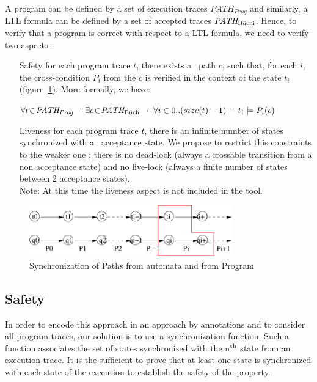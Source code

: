 \documentclass{report}
\begin{document}
A program can be defined by a set of execution traces
$\textit{PATH}_{\textit{Prog}}$ and similarly, a LTL formula can be defined by a
set of accepted traces $\textit{PATH}_{\textnormal{B\"uchi}}$. Hence, to verify that a program
is correct with respect to a LTL formula, we need to verify two aspects:
\begin{itemize}
  \item[Safety] for each program trace $t$, there exists a \buchi\ path $c$,
    such that, for each $i$, the cross-condition $P_i$ from the $c$ is verified
    in the context of the state $t_i$ (figure~\ref{FigExplicationSynchro}). More
    formally, we have:

    \centerline{
      $\forall t \!\in\! \textit{PATH}_{\textit{Prog}} ~\cdot~ \exists c \!\in\!
      \textit{PATH}_{\textnormal{B\"uchi}} ~\cdot~ \forall i\in 0..(size(t)-1) ~\cdot~ t_i
      \models P_i(c)$
    }


  \item[Liveness] for each program trace $t$, there is an infinite number of
    states synchronized with a \buchi\ acceptance state. We propose to restrict
    this constraints to the weaker one : there is no dead-lock (always a
    crossable transition from a non acceptance state) and no live-lock (always a
    finite number of states between 2 acceptance states).\\
  Note: At this time the liveness aspect is not included in the tool.

\end{itemize}

\begin{figure}[ht]
    \centerline{\includegraphics[width=250pt]{Schemas/synchro}}
    \caption{Synchronization of Paths from automata and from Program}
    \label{FigExplicationSynchro}
\end{figure}


\subsection{Safety}
In order to encode this approach in an approach by annotations and to consider
all program traces, our solution is to use a synchronization function. Such a
function associates the set of states synchronized with the
n$^{\textnormal{th}}$ state from an execution trace. It is the sufficient to
prove that at least one state is synchronized with each state of the execution to
establish the safety of the property.
\end{document}
